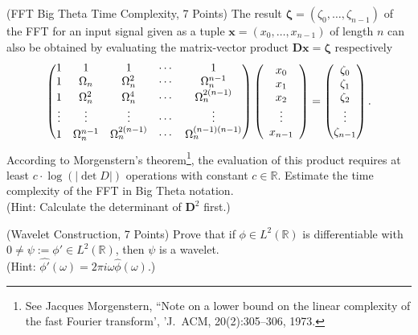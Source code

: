 \documentclass[11pt]{article}
\begin{document}
\begin{exercise}
\newpage
\begin{exercise}(FFT Big Theta Time Complexity, 7 Points)
The result $\boldsymbol{\zeta}=(\zeta_0,\dots,\zeta_{n-1})$ of the FFT for an input signal given as a tuple $\boldsymbol{x}=(x_0,\dots,x_{n-1})$ of length $n$ can also be obtained by evaluating the matrix-vector product $\boldsymbol{D}\boldsymbol{x}=\boldsymbol{\zeta}$ respectively
$$
\left( \begin{array}{@{}ccccc@{}}
1 & 1        & 1        & \cdots & 1 \\
1 & \Omega_n   & \Omega_n^2 & \cdots & \Omega_n^{n-1} \\
1 & \Omega_n^2 & \Omega_n^4 & \cdots & \Omega_n^{2(n-1)} \\
\vdots & \vdots & \vdots & \cdots & \vdots \\
1 & \Omega_n^{n-1} & \Omega_n^{2(n-1)} & \cdots & \Omega_n^{(n-1)(n-1)}
\end{array}\right)
\left( \begin{array}{c}
x_0 \\ x_1 \\ x_2 \\ \vdots \\ x_{n-1}
\end{array}\right)
=
\left( \begin{array}{@{}c@{}}
\zeta_0 \\ \zeta_1 \\ \zeta_2 \\ \vdots \\ \zeta_{n-1}
\end{array}\right).
$$
According to Morgenstern's theorem\footnote{See Jacques Morgenstern, ``Note on a lower bound on the linear complexity of the fast Fourier transform', 'J.~ACM, 20(2):305--306, 1973.}, the evaluation of this product requires at least $c\cdot\log(|\det D|)$ operations with constant $c\in\mathbb{R}$. Estimate the time complexity of the FFT in Big Theta notation.\\
(Hint: Calculate the determinant of $\boldsymbol{D}^2$ first.)\\
\end{exercise}
\begin{exercise}(Wavelet Construction, 7 Points)
Prove that if $\phi\in L^2(\mathbb{R})$ is differentiable with $0\neq\psi:=\phi'\in L^2(\mathbb{R})$, then $\psi$ is a wavelet.\\
(Hint: $\hat{\phi'}(\omega)=2\pi i\omega\hat{\phi}(\omega)$.)
\end{exercise}

\end{exercise}
\end{document}

